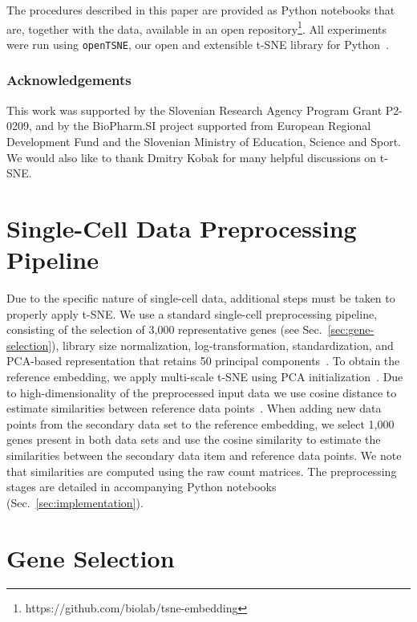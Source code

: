 \documentclass[runningheads]{llncs}
\begin{document}
The procedures described in this paper are provided as Python notebooks that
are, together with the data, available in an open
repository\footnote{https://github.com/biolab/tsne-embedding}. All experiments
were run using {\tt openTSNE},
our open and extensible t-SNE library for Python~\cite{opentsne}.


\subsubsection*{Acknowledgements}

This work was supported by the Slovenian Research Agen\-cy Program Grant P2-0209,
and by the BioPharm.SI project supported from European Regional Development
Fund and the Slovenian Ministry of Education, Science and Sport. We would also
like to thank Dmitry Kobak for many helpful discussions on t-SNE.

% 



\appendix

\section{Single-Cell Data Preprocessing Pipeline\label{sec:sc-pipeline}}

Due to the specific nature of single-cell data, additional steps must be taken
to properly apply t-SNE. We use a standard single-cell preprocessing pipeline,
consisting of the selection of 3,000 representative genes (see
Sec.~\ref{sec:gene-selection}), library size normalization, log-transformation,
standardization, and PCA-based representation that retains 50 principal
components~\cite{Stuart2019,Wolf2018}. To obtain the reference embedding, we apply
multi-scale t-SNE using PCA initialization~\cite{Kobak2019}. Due to
high-dimensionality of the preprocessed input data we use cosine distance to
estimate similarities between reference data points~\cite{Domingos2012}.
When adding new data points from the secondary data set to the reference
embedding, we select 1,000 genes present in both data sets and use the cosine
similarity to estimate the similarities between the secondary data item and
reference data points. We note that similarities are computed using the raw
count matrices. The preprocessing stages are detailed in accompanying Python
notebooks (Sec.~\ref{sec:implementation}).

\section{Gene Selection\label{sec:gene-selection}}
\end{document}
